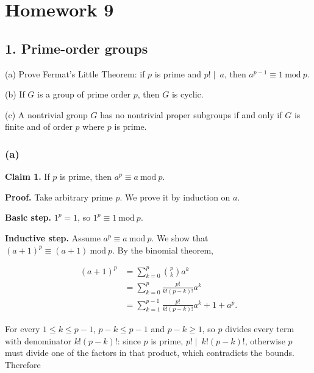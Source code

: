 \chapter{Homework 9}

\section{1. Prime-order groups}

(a) Prove Fermat's Little Theorem: if \(p\) is prime and \(\left. p! \middle| \ a \right.\), then \(a^{p - 1} \equiv 1\ \text{mod}\ p\).

(b) If \(G\) is a group of prime order \(p\), then \(G\) is cyclic.

(c) A nontrivial group \(G\) has no nontrivial proper subgroups if and only if \(G\) is finite and of order \(p\) where \(p\) is prime.

\subsection{(a)}

\textbf{Claim 1.} If \(p\) is prime, then \(a^{p} \equiv a\ \text{mod}\ p\).

\textbf{Proof.} Take arbitrary prime \(p\). We prove it by induction on \(a\).

\textbf{Basic step.} \(1^{p} = 1\), so \(1^{p} \equiv 1\ \text{mod}\ p\).

\textbf{Inductive step.} Assume \(a^{p} \equiv a\ \text{mod}\ p\). We show that \(\left( {a + 1} \right)^{p} \equiv \left( {a + 1} \right)\ \text{mod}\ p\). By the binomial theorem,

\[\begin{matrix}
\left( {a + 1} \right)^{p} & {= \sum\limits_{k = 0}^{p}\binom{p}{k}a^{k}} \\
 & {= \sum\limits_{k = 0}^{p}\frac{p!}{k!\left( {p - k} \right)!}a^{k}} \\
 & {= \sum\limits_{k = 1}^{p - 1}\frac{p!}{k!\left( {p - k} \right)!}a^{k} + 1 + a^{p}.}
\end{matrix}\]

For every \(1 \leq k \leq p - 1\), \(p - k \leq p - 1\) and \(p - k \geq 1\), so \(p\) divides every term with denominator \(k!\left( {p - k} \right)!\): since \(p\) is prime, \(\left. p! \middle| \ k!\left( {p - k} \right)! \right.\), otherwise \(p\) must divide one of the factors in that product, which contradicts the bounds. Therefore

